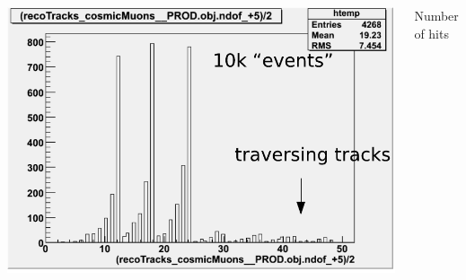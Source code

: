 \documentclass[compress]{beamer}
\begin{document}
\begin{frame}
\begin{columns}
\vspace{0.5 cm}
\includegraphics[width=\linewidth]{karoly_illumination3.pdf} \\
\vspace{-0.5 cm}
\begin{center}
Number of hits
\end{center}
\end{columns}
\end{frame}





\end{document}
